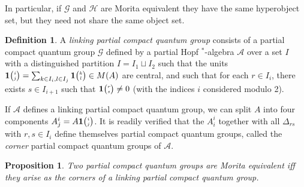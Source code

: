 \documentclass[10pt]{article}
\newcommand{\Grt}[3]{#1{\tiny {\begin{pmatrix} #2\\#3\end{pmatrix}}}}
\newcommand{\UnitC}[2]{\Grt{\mathbf{1}}{#1}{#2}}
\newtheorem{Prop}[Theorem]{Proposition}
\theoremstyle{definition}
\newtheorem{Def}[Theorem]{Definition}
\numberwithin{equation}{section}
\begin{document}
In particular, if $\mathscr{G}$ and $\mathscr{H}$ are Morita equivalent they have the same hyperobject set, but they need not share the same object set.

\begin{Def} A \emph{linking partial compact quantum group} consists of a partial compact quantum group $\mathscr{G}$ defined by a partial Hopf $^*$-algebra $\mathscr{A}$ over a set $I$ with a distinguished partition $I = I_1\sqcup I_2$ such that the units $\UnitC{i}{j} = \sum_{k\in I_i,l\in I_j} \UnitC{k}{l} \in M(A)$ are central, and such that for each $r\in I_i$, there exists $s\in I_{i+1}$ such that $\UnitC{r}{s}\neq 0$ (with the indices $i$ considered modulo 2).
\end{Def}

If $\mathscr{A}$ defines a linking partial compact quantum group, we can split $A$ into four components $A^i_j = A\UnitC{i}{j}$. It is readily verified that the $A^i_i$ together with all $\Delta_{rs}$ with $r,s \in I_i$ define themselves partial compact quantum groups, called the \emph{corner} partial compact quantum groups of $\mathscr{A}$. 

\begin{Prop} Two partial compact quantum groups are Morita equivalent iff they arise as the corners of a linking partial compact quantum group.
\end{Prop}
\end{document}
